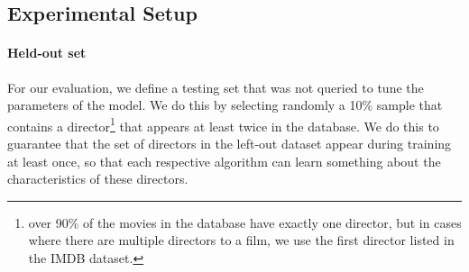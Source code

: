 \documentclass{article} %
\begin{document}
\subsection{Experimental Setup}
\paragraph{Held-out set} For our evaluation, we define a testing set that was not queried to tune the parameters of the model. 
We do this by selecting randomly a 10\% sample that contains a director\footnote{over 90\% of the movies in the database have exactly one director, but in cases where there are multiple directors to a film, we use the first director listed in the IMDB dataset.} that appears at least twice in the database.
We do this to guarantee that the set of directors in the left-out dataset appear during training at least once, so that each respective algorithm can learn something about the characteristics of these directors.

 
\end{document}

